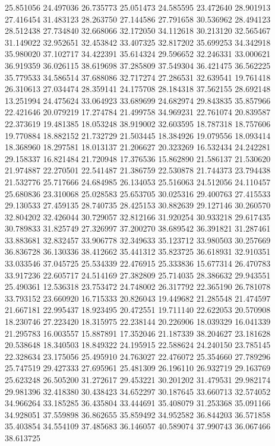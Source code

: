25.851056
24.497036
26.735773
25.051473
24.585595
23.472640
28.901913
27.416454
31.483123
28.263750
27.144586
27.791658
30.536962
28.494123
28.512438
27.734840
32.668066
32.172050
34.112618
30.213120
32.565467
31.149022
32.952651
32.453842
33.407325
32.817202
35.699253
34.342918
35.980020
37.102717
34.422391
35.614324
29.596652
32.246331
33.000621
36.919359
36.026115
38.619698
37.285809
37.549304
36.421475
36.562225
35.779533
34.586514
37.688086
32.717274
27.286531
32.639541
19.761418
26.310613
27.034474
28.359141
24.175708
28.184318
37.562155
28.692148
13.251994
24.475624
33.064923
33.689699
24.682974
29.843835
35.857966
22.421646
20.079219
17.274784
21.499758
34.969231
22.761074
20.839587
22.373619
19.481385
18.053248
38.919002
32.603595
18.787318
18.757606
19.770884
18.882152
21.732729
21.503445
18.384926
19.079556
18.093414
18.368960
18.297581
18.013137
21.206627
20.323269
16.532434
24.242281
29.158337
16.821484
21.720948
17.376536
15.862890
21.586137
21.530620
21.974887
22.270501
22.541487
21.386759
22.530878
21.744373
23.794438
21.532776
25.717666
24.684985
26.134053
25.516063
24.512056
24.110457
25.680836
23.310068
25.028583
25.653705
30.025316
29.400763
27.415533
29.130533
27.459135
28.740735
28.425153
30.882639
29.127146
30.260570
32.804202
32.426044
30.729057
32.812166
31.920254
30.933218
29.617435
30.789833
31.825749
27.326997
37.200270
38.689542
36.391821
31.287461
33.883681
32.832457
33.906778
32.349633
35.123712
33.980503
30.257669
36.836728
36.130336
38.412662
35.441312
35.823725
36.618931
32.910351
33.033546
37.045725
25.534339
22.476915
25.333836
15.677314
26.470783
33.917236
22.605717
24.514169
27.382809
25.714035
28.386632
29.943551
25.490361
12.536318
23.753472
24.748002
26.317792
22.365190
26.781078
33.793152
23.660920
16.715333
20.826043
19.449682
21.285548
21.474597
21.667181
22.995437
18.923495
20.472551
19.711140
22.622053
20.570908
18.230746
27.223420
18.315975
22.238144
20.226906
18.039329
16.041339
21.295783
16.003557
15.887891
17.352046
21.187339
38.204627
23.181628
20.538648
18.340503
18.849322
24.195915
22.588624
24.240150
23.785145
22.328634
23.175056
25.495910
24.763027
22.476072
25.354660
27.789296
25.747519
29.427333
27.695961
25.481309
26.196110
26.932719
29.163769
25.623248
26.505200
31.272617
29.453221
30.201202
31.479531
29.982174
29.981396
32.418380
30.438423
34.652297
30.187645
33.660713
32.574052
34.966264
33.185285
36.435804
33.444691
35.408079
31.253368
35.091166
34.928051
37.559898
36.862655
35.859492
34.952582
36.844203
36.571858
35.403854
34.554109
37.485683
36.146057
40.589074
37.990743
36.067466
38.613725
